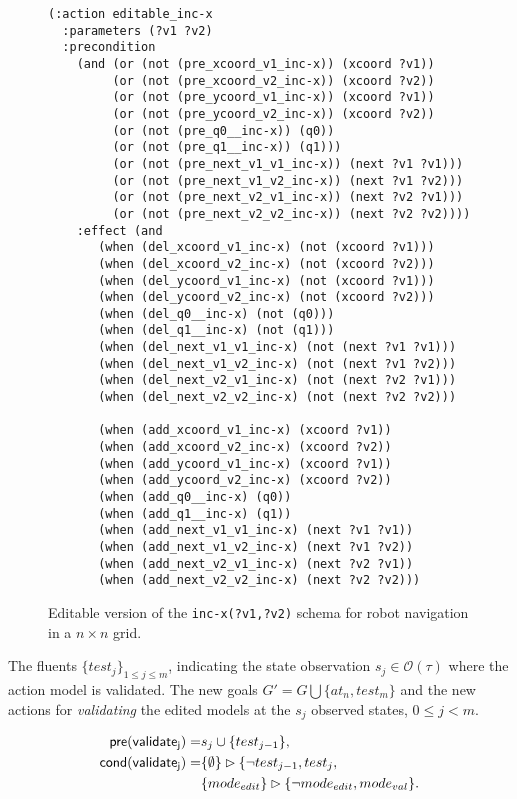 \documentclass{article}
\newcommand{\pre}{\mathsf{pre}}     %
\newcommand{\cond}{\mathsf{cond}}   %
\begin{document}
\begin{figure}
  \begin{tiny}  
  \begin{verbatim}
(:action editable_inc-x
  :parameters (?v1 ?v2)
  :precondition
    (and (or (not (pre_xcoord_v1_inc-x)) (xcoord ?v1))
         (or (not (pre_xcoord_v2_inc-x)) (xcoord ?v2))
         (or (not (pre_ycoord_v1_inc-x)) (xcoord ?v1))                       
         (or (not (pre_ycoord_v2_inc-x)) (xcoord ?v2))
         (or (not (pre_q0__inc-x)) (q0))
         (or (not (pre_q1__inc-x)) (q1)))
         (or (not (pre_next_v1_v1_inc-x)) (next ?v1 ?v1)))
         (or (not (pre_next_v1_v2_inc-x)) (next ?v1 ?v2)))
         (or (not (pre_next_v2_v1_inc-x)) (next ?v2 ?v1)))
         (or (not (pre_next_v2_v2_inc-x)) (next ?v2 ?v2))))
    :effect (and
       (when (del_xcoord_v1_inc-x) (not (xcoord ?v1)))
       (when (del_xcoord_v2_inc-x) (not (xcoord ?v2)))
       (when (del_ycoord_v1_inc-x) (not (xcoord ?v1)))
       (when (del_ycoord_v2_inc-x) (not (xcoord ?v2)))
       (when (del_q0__inc-x) (not (q0)))
       (when (del_q1__inc-x) (not (q1)))
       (when (del_next_v1_v1_inc-x) (not (next ?v1 ?v1)))
       (when (del_next_v1_v2_inc-x) (not (next ?v1 ?v2)))
       (when (del_next_v2_v1_inc-x) (not (next ?v2 ?v1)))
       (when (del_next_v2_v2_inc-x) (not (next ?v2 ?v2)))
       
       (when (add_xcoord_v1_inc-x) (xcoord ?v1))
       (when (add_xcoord_v2_inc-x) (xcoord ?v2))
       (when (add_ycoord_v1_inc-x) (xcoord ?v1))
       (when (add_ycoord_v2_inc-x) (xcoord ?v2))
       (when (add_q0__inc-x) (q0))
       (when (add_q1__inc-x) (q1))
       (when (add_next_v1_v1_inc-x) (next ?v1 ?v1))
       (when (add_next_v1_v2_inc-x) (next ?v1 ?v2))
       (when (add_next_v2_v1_inc-x) (next ?v2 ?v1))
       (when (add_next_v2_v2_inc-x) (next ?v2 ?v2)))
  \end{verbatim}           
  \end{tiny}  
 \caption{\small Editable version of the {\tt\small inc-x(?v1,?v2)} schema for robot navigation in a $n\times n$ grid.}
\label{fig:editable}
\end{figure}

The fluents $\{test_j\}_{1\leq j\leq m}$, indicating the state observation $s_j\in\mathcal{O}(\tau)$ where the action model is validated. The new goals $G'=G\bigcup\{at_n,test_m\}$ and the new actions for {\em validating} the edited models at the $s_j$ observed states, {\tt\small $0\leq j< m$}.
\begin{small}
\begin{align*}
\hspace*{7pt}\pre(\mathsf{validate_{j}})=&s_j\cup\{test_{j-1}\},\\
\cond(\mathsf{validate_{j}})=&\{\emptyset\}\rhd\{\neg test_{j-1}, test_j,\\
                            &\{mode_{edit}\}\rhd\{\neg mode_{edit}, mode_{val}\}.
\end{align*}
\end{small}
\end{document}
